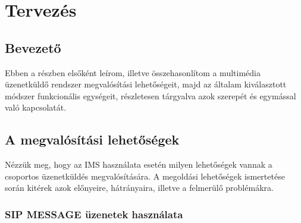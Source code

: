 

\section{Tervezés}

\subsection{Bevezető}

Ebben a részben elsőként leírom, illetve összehasonlítom a multimédia üzenetküldő rendszer megvalósítási lehetőségeit, majd az általam kiválasztott módszer funkcionális egységeit,  részletesen tárgyalva azok szerepét és egymással való kapcsolatát.

\subsection{A megvalósítási lehetőségek}

Nézzük meg, hogy az IMS használata esetén milyen lehetőségek vannak a csoportos üzenetküldés megvalósítására. A megoldási lehetőségek ismertetése során kitérek azok előnyeire, hátrányaira, illetve a felmerülő problémákra.

\subsubsection{SIP MESSAGE üzenetek használata}
\label{sec:sip_message}

